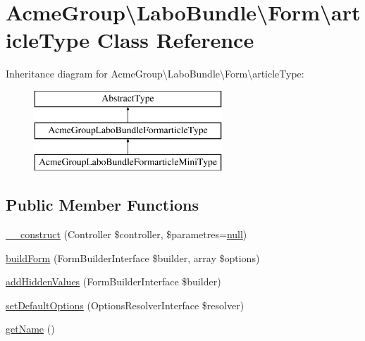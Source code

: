 \hypertarget{class_acme_group_1_1_labo_bundle_1_1_form_1_1article_type}{\section{Acme\+Group\textbackslash{}Labo\+Bundle\textbackslash{}Form\textbackslash{}article\+Type Class Reference}
\label{class_acme_group_1_1_labo_bundle_1_1_form_1_1article_type}
}
Inheritance diagram for Acme\+Group\textbackslash{}Labo\+Bundle\textbackslash{}Form\textbackslash{}article\+Type\+:\begin{figure}[H]
\begin{center}
\leavevmode
\includegraphics[height=3.000000cm]{class_acme_group_1_1_labo_bundle_1_1_form_1_1article_type}
\end{center}
\end{figure}
\subsection*{Public Member Functions}
\begin{DoxyCompactItemize}
\item 
\hyperlink{class_acme_group_1_1_labo_bundle_1_1_form_1_1article_type_afd7da7eaefb6c89f8d245ab569e13875}{\+\_\+\+\_\+construct} (Controller \$controller, \$parametres=\hyperlink{validate_8js_afb8e110345c45e74478894341ab6b28e}{null})
\item 
\hyperlink{class_acme_group_1_1_labo_bundle_1_1_form_1_1article_type_a579a6016c788222a8f44d52e86bf61d3}{build\+Form} (Form\+Builder\+Interface \$builder, array \$options)
\item 
\hyperlink{class_acme_group_1_1_labo_bundle_1_1_form_1_1article_type_a9b056610a620f90688132373aa54af63}{add\+Hidden\+Values} (Form\+Builder\+Interface \$builder)
\item 
\hyperlink{class_acme_group_1_1_labo_bundle_1_1_form_1_1article_type_a437e2f277c8b7dc80b29bfb2344ebe43}{set\+Default\+Options} (Options\+Resolver\+Interface \$resolver)
\item 
\hyperlink{class_acme_group_1_1_labo_bundle_1_1_form_1_1article_type_a8012264e2bc78d4b26e443bab6a6013e}{get\+Name} ()
\end{DoxyCompactItemize}


